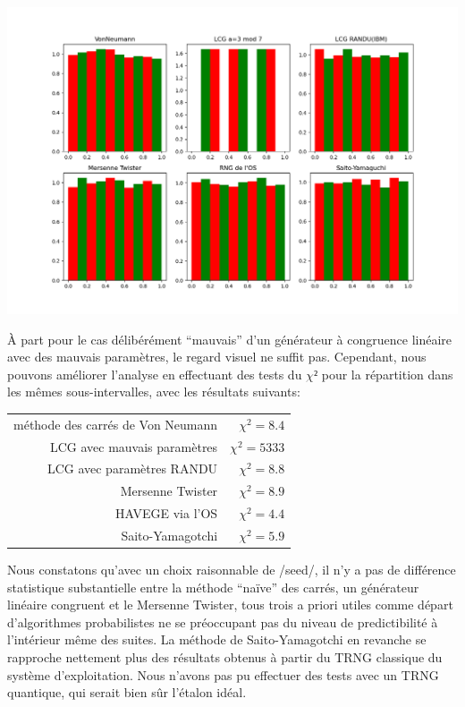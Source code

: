 \documentclass{scrartcl}
\begin{document}
\begin{center}
  \includegraphics[width=\textwidth]{img/rng8000b.png}
\end{center}
À part pour le cas délibérément ``mauvais'' d'un générateur
à congruence linéaire avec des mauvais paramètres, le regard visuel ne suffit
pas. Cependant, nous pouvons améliorer l'analyse en effectuant des tests du
$\chi²$ pour la répartition dans les mêmes sous-intervalles, avec les résultats
suivants:
\begin{center}
  \begin{tabular}{rr}
    méthode des carrés de Von Neumann& {$\chi^2 = 8.4$}\\
    LCG avec mauvais paramètres& {$\chi^2 = 5333$}\\
    LCG avec paramètres RANDU& {$\chi^2 = 8.8$}\\
    Mersenne Twister& {$\chi^2 = 8.9$}\\
    HAVEGE via l'OS& {$\chi^2 = 4.4$}\\
    Saito-Yamagotchi& {$\chi^2 = 5.9$}
  \end{tabular}
\end{center}

Nous constatons qu'avec un choix raisonnable de /seed/, il n'y a pas de
différence statistique substantielle entre la méthode ``naïve'' des carrés, un
générateur linéaire congruent et le Mersenne Twister, tous trois a priori utiles
comme départ d'algorithmes probabilistes ne se préoccupant pas du niveau de
predictibilité à l'intérieur même des suites.  La méthode de Saito-Yamagotchi
en revanche se rapproche nettement plus des résultats obtenus à partir du TRNG
classique du système d'exploitation. Nous n'avons pas pu effectuer des tests
avec un TRNG quantique, qui serait bien sûr l'étalon idéal.
\end{document}
